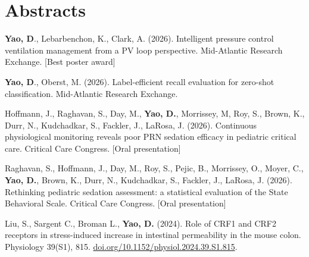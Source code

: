 \documentclass[11pt]{article}       %
\begin{document}
\vspace{-18pt}

\section*{Abstracts}

\textbf{Yao, D}., Lebarbenchon, K., Clark, A. (2026). Intelligent pressure control ventilation management from a PV loop perspective. Mid-Atlantic Research Exchange. [Best poster award] \\

\vspace{9pt}

\textbf{Yao, D}., Oberst, M. (2026). Label-efficient recall evaluation for zero-shot classification. Mid-Atlantic Research Exchange. \\

\vspace{9pt}

Hoffmann, J., Raghavan, S., Day, M., \textbf{Yao, D.}, Morrissey, M, Roy, S., Brown, K., Durr, N., Kudchadkar, S., Fackler, J., LaRosa, J. (2026). Continuous physiological monitoring reveals poor PRN sedation efficacy in pediatric critical care. Critical Care Congress. [Oral presentation] \\

\vspace {9pt}

Raghavan, S., Hoffmann, J., Day, M., Roy, S., Pejic, B., Morrissey, O., Moyer, C., \textbf{Yao, D.}, Brown, K., Durr, N., Kudchadkar, S., Fackler, J., LaRosa, J. (2026). Rethinking pediatric sedation assessment: a statistical evaluation of the State Behavioral Scale. Critical Care Congress. [Oral presentation] \\

\vspace{9pt}

Liu, S., Sargent C., Broman L., \textbf{Yao, D.} (2024). Role of CRF1 and CRF2 receptors in stress-induced increase in intestinal permeability in the mouse colon. Physiology 39(S1), 815. \href{https://doi.org/10.1152/physiol.2024.39.S1.815}{doi.org/10.1152/physiol.2024.39.S1.815}. \\

\vspace{-9pt}
\end{document}
